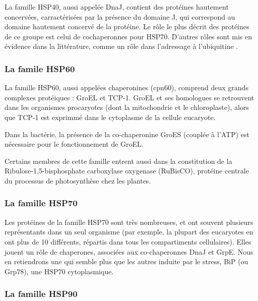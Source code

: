   La famille HSP40, aussi appelée DnaJ, contient des protéines hautement
  concervées, carractérisées par la présence du domaine J, qui correspond au
  domaine hautement concervé de la protéine. Le rôle le plus décrit des
  protéines de ce groupe est celui de cochaperonnes pour HSP70. D'autres rôles
  sont mis en évidence dans la littérature, comme un rôle dans l'adressage à
  l'ubiquitine \cite{lee1996}.

\subsubsection{La famile HSP60} %
\label{ssub:la_famile_hsp60}

  La famille HSP60, aussi appelées chaperonines (cpn60), comprend deux grands
  complexes protéiques : GroEL et TCP-1. GroEL et ses homologues se retrouvent
  dans les organismes procaryotes (dont la mitochondrie et le chloroplaste),
  alors que TCP-1 est exprimmé dans le cytoplasme de la cellule eucaryote.

  Dans la bactérie, la présence de la co-chaperonine GroES (couplée à l'ATP)
  est nécessaire pour le fonctionnement de GroEL.

  Certains membres de cette famille entrent aussi dans la constitution de la
  Ribulose-1,5-bisphosphate carboxylase oxygenase (RuBisCO), protéine centrale
  du processus de photosynthèse chez les plantes.

\subsubsection{La famille HSP70} %
\label{ssub:la_famille_hsp70}

  Les protéines de la famille HSP70 sont très nombreuses, et ont souvent
  plusieurs représentants dans un seul organisme (par exemple, la plupart des
  eucaryotes en ont plus de 10 différents, répartis dans tous les
  compartiments cellulaires). Elles jouent un rôle de chaperones, associées
  aux co-chaperonnes DnaJ et GrpE. Nous en retiendrons une qui semble plus que
  les autres induite par le stress, BiP (ou Grp78), une HSP70 cytoplasmique.

\subsubsection{La famille HSP90} %
\label{ssub:la_famille_hsp90}


